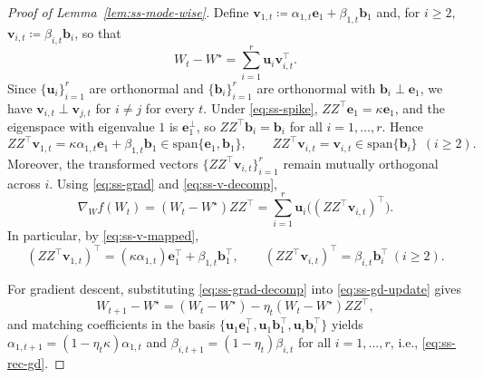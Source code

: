 \documentclass[11pt]{article}
\begin{document}
\begin{proof}[Proof of Lemma~\ref{lem:ss-mode-wise}]
Define $\boldsymbol{v}_{1,t}\coloneqq \alpha_{1,t}\boldsymbol{e}_1+\beta_{1,t}\boldsymbol{b}_1$ and, for $i\ge 2$, $\boldsymbol{v}_{i,t}\coloneqq \beta_{i,t}\boldsymbol{b}_i$, so that
\begin{equation}
  \label{eq:ss-v-decomp}
  W_t-W^\star=\sum_{i=1}^r \boldsymbol{u}_i\boldsymbol{v}_{i,t}^\top.
\end{equation}
Since $\{\boldsymbol{u}_i\}_{i=1}^r$ are orthonormal and $\{\boldsymbol{b}_i\}_{i=1}^r$ are orthonormal with $\boldsymbol{b}_i\perp \boldsymbol{e}_1$, we have $\boldsymbol{v}_{i,t}\perp \boldsymbol{v}_{j,t}$ for $i\neq j$ for every $t$.
Under \eqref{eq:ss-spike}, $ZZ^\top \boldsymbol{e}_1=\kappa \boldsymbol{e}_1$, and the eigenspace with eigenvalue $1$ is $\boldsymbol{e}_1^\perp$, so $ZZ^\top \boldsymbol{b}_i=\boldsymbol{b}_i$ for all $i=1,\dots,r$. Hence
\begin{equation}
  \label{eq:ss-v-mapped}
  ZZ^\top \boldsymbol{v}_{1,t}=\kappa\alpha_{1,t}\boldsymbol{e}_1+\beta_{1,t}\boldsymbol{b}_1 \in \mathrm{span}\{\boldsymbol{e}_1,\boldsymbol{b}_1\},
  \qquad
  ZZ^\top \boldsymbol{v}_{i,t}=\boldsymbol{v}_{i,t}\in \mathrm{span}\{\boldsymbol{b}_i\}\ \ (i\ge 2).
\end{equation}
Moreover, the transformed vectors $\{ZZ^\top\boldsymbol{v}_{i,t}\}_{i=1}^r$ remain mutually orthogonal across $i$. Using \eqref{eq:ss-grad} and \eqref{eq:ss-v-decomp},
\begin{equation}
  \label{eq:ss-grad-decomp}
  \nabla_W f(W_t)=(W_t-W^\star)ZZ^\top
  =
  \sum_{i=1}^r \boldsymbol{u}_i\big((ZZ^\top\boldsymbol{v}_{i,t})^\top\big).
\end{equation}
In particular, by \eqref{eq:ss-v-mapped},
\[
(ZZ^\top\boldsymbol{v}_{1,t})^\top=(\kappa\alpha_{1,t})\boldsymbol{e}_1^\top+\beta_{1,t}\boldsymbol{b}_1^\top,
\qquad
(ZZ^\top\boldsymbol{v}_{i,t})^\top=\beta_{i,t}\boldsymbol{b}_i^\top \ (i\ge 2).
\]

For gradient descent, substituting \eqref{eq:ss-grad-decomp} into \eqref{eq:ss-gd-update} gives
\[
W_{t+1}-W^\star
=
(W_t-W^\star)-\eta_t(W_t-W^\star)ZZ^\top,
\]
and matching coefficients in the basis $\{\boldsymbol{u}_1\boldsymbol{e}_1^\top,\boldsymbol{u}_1\boldsymbol{b}_1^\top,\boldsymbol{u}_i\boldsymbol{b}_i^\top\}$ yields $\alpha_{1,t+1}=(1-\eta_t\kappa)\alpha_{1,t}$ and $\beta_{i,t+1}=(1-\eta_t)\beta_{i,t}$ for all $i=1,\dots,r$, i.e., \eqref{eq:ss-rec-gd}.


\end{proof}
\end{document}
